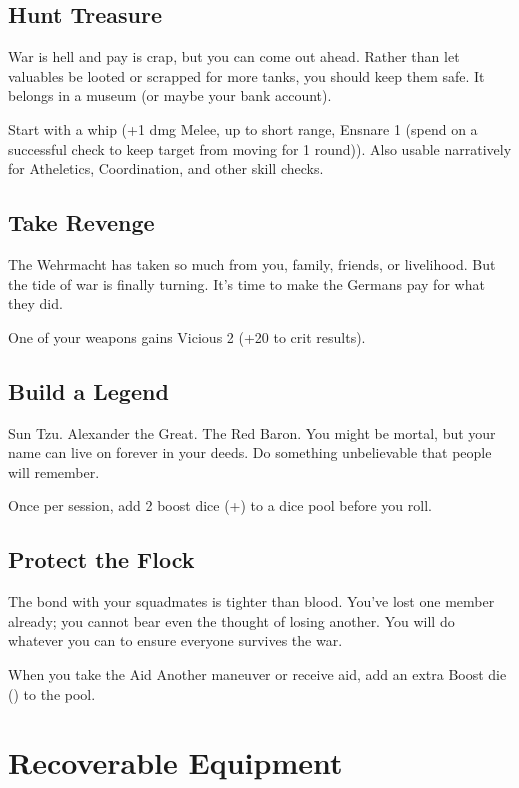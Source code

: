 \documentclass[background]{book}
\newcommand{\bbb}{\BoostDie}
\begin{document}
\begin{multicols}{2}
\subsection{Hunt Treasure}

War is hell and pay is crap, but you can come out ahead.  Rather than let valuables be looted or scrapped for more tanks, you should keep them safe.  It belongs in a museum (or maybe your bank account).

Start with a whip (+1 dmg Melee, up to short range, Ensnare 1 (spend \Advantage\Advantage on a successful check to keep target from moving for 1 round)).  Also usable narratively for Atheletics, Coordination, and other skill checks.

\subsection{Take Revenge}

The Wehrmacht has taken so much from you, family, friends, or livelihood.  But the tide of war is finally turning.  It's time to make the Germans pay for what they did.

One of your weapons gains Vicious 2 (+20 to crit results).

\subsection{Build a Legend}

Sun Tzu.  Alexander the Great.  The Red Baron.  You might be mortal, but your name can live on forever in your deeds.  Do something unbelievable that people will remember.

Once per session, add 2 boost dice (+\bbb\bbb) to a dice pool before you roll.

\subsection{Protect the Flock}

The bond with your squadmates is tighter than blood.  You've lost one member already; you cannot bear even the thought of losing another.  You will do whatever you can to ensure everyone survives the war.

When you take the Aid Another maneuver or receive aid, add an extra Boost die (\bbb) to the pool.

\section{Recoverable Equipment}


\end{multicols}
\end{document}
